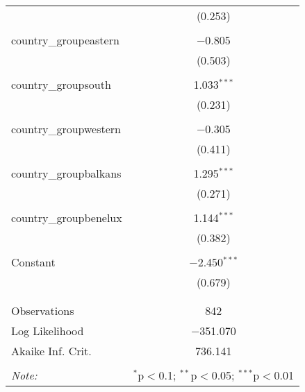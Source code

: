 \begin{table}[!htbp]
\begin{tabular}{@{\extracolsep{5pt}}lc}
  & (0.253) \\ 
  & \\ 
 country\_groupeastern & $-$0.805 \\ 
  & (0.503) \\ 
  & \\ 
 country\_groupsouth & 1.033$^{***}$ \\ 
  & (0.231) \\ 
  & \\ 
 country\_groupwestern & $-$0.305 \\ 
  & (0.411) \\ 
  & \\ 
 country\_groupbalkans & 1.295$^{***}$ \\ 
  & (0.271) \\ 
  & \\ 
 country\_groupbenelux & 1.144$^{***}$ \\ 
  & (0.382) \\ 
  & \\ 
 Constant & $-$2.450$^{***}$ \\ 
  & (0.679) \\ 
  & \\ 
\hline \\[-1.8ex] 
Observations & 842 \\ 
Log Likelihood & $-$351.070 \\ 
Akaike Inf. Crit. & 736.141 \\ 
\hline 
\hline \\[-1.8ex] 
\textit{Note:}  & \multicolumn{1}{r}{$^{*}$p$<$0.1; $^{**}$p$<$0.05; $^{***}$p$<$0.01} \\ 
\end{tabular} 
\end{table} 
